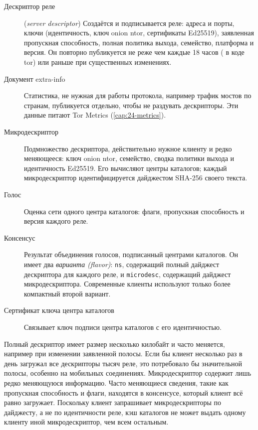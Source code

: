 \begin{description}
  \item[Дескриптор реле] (\emph{server descriptor}) Создаётся и подписывается реле: адреса и порты, ключи (идентичность, ключ onion ntor, сертификаты Ed25519), заявленная пропускная способность, полная политика выхода, семейство, платформа и версия. Он повторно публикуется не реже чем каждые 18 часов ( в коде tor) или раньше при существенных изменениях.
  \item[Документ extra-info] Статистика, не нужная для работы протокола, например трафик мостов по странам, публикуется отдельно, чтобы не раздувать дескрипторы. Эти данные питают Tor Metrics (\cref{cap:24-metrics}).
  \item[Микродескриптор] Подмножество дескриптора, действительно нужное клиенту и редко меняющееся: ключ onion ntor, семейство, сводка политики выхода и идентичность Ed25519. Его вычисляют центры каталогов; каждый микродескриптор идентифицируется дайджестом SHA-256 своего текста.
  \item[Голос] Оценка сети одного центра каталогов: флаги, пропускная способность и версия каждого реле.
  \item[Консенсус] Результат объединения голосов, подписанный центрами каталогов. Он имеет два \emph{варианта (flavor)}: \texttt{ns}, содержащий полный дайджест дескриптора для каждого реле, и \texttt{microdesc}, содержащий дайджест микродескриптора. Современные клиенты используют только более компактный второй вариант.
  \item[Сертификат ключа центра каталогов] Связывает ключ подписи центра каталогов с его идентичностью.
\end{description}

\begin{approfondimento}
Полный дескриптор имеет размер несколько килобайт и часто меняется, например при изменении заявленной полосы. Если бы клиент несколько раз в день загружал все дескрипторы тысяч реле, это потребовало бы значительной полосы, особенно на мобильных соединениях. Микродескриптор содержит лишь редко меняющуюся информацию. Часто меняющиеся сведения, такие как пропускная способность и флаги, находятся в консенсусе, который клиент всё равно загружает. Поскольку клиент запрашивает микродескрипторы по дайджесту, а не по идентичности реле, кэш каталогов не может выдать одному клиенту иной микродескриптор, чем всем остальным.
\end{approfondimento}

